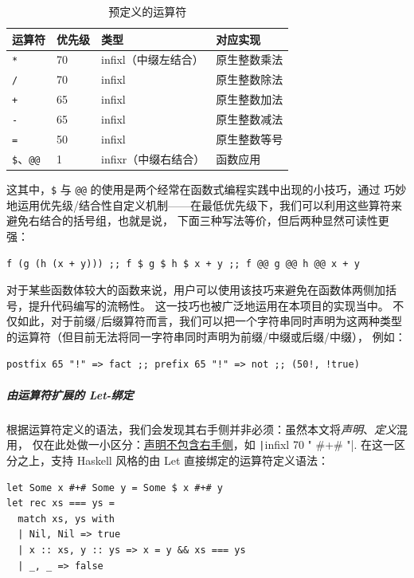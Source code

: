 \begin{table}
  \centering
  \caption{预定义的运算符}\label{tab:exproperator-prec}
  \begin{tabular}{@{}llll@{}}
    \toprule
    \textbf{运算符} & \textbf{优先级} & \textbf{类型}  & \textbf{对应实现}                   \\ \midrule
    \texttt{*}        & 70         & infixl（中缀左结合） & 原生整数乘法 \\
    \texttt{/}        & 70         & infixl & 原生整数除法       \\
    \texttt{+}        & 65         & infixl & 原生整数加法       \\
    \texttt{-}        & 65         & infixl & 原生整数减法    \\
    \texttt{=}        & 50         & infixl & 原生整数等号       \\
    \texttt{\$}、\texttt{@@}       & 1          & infixr（中缀右结合）& 函数应用             \\ \bottomrule
  \end{tabular}
\end{table}

这其中，\texttt{\$} 与 \texttt{@@} 的使用是两个经常在函数式编程实践中出现的小技巧，通过
巧妙地运用优先级/结合性自定义机制——在最低优先级下，我们可以利用这些算符来避免右结合的括号组，也就是说，
下面三种写法等价，但后两种显然可读性更强：
\begin{verbatim}
f (g (h (x + y))) ;; f $ g $ h $ x + y ;; f @@ g @@ h @@ x + y
\end{verbatim}
对于某些函数体较大的函数来说，用户可以使用该技巧来避免在函数体两侧加括号，提升代码编写的流畅性。
这一技巧也被广泛地运用在本项目的实现当中。
不仅如此，对于前缀/后缀算符而言，我们可以把一个字符串同时声明为这两种类型的运算符（但目前无法将同一字符串同时声明为前缀/中缀或后缀/中缀），
例如：
\begin{verbatim}
postfix 65 "!" => fact ;; prefix 65 "!" => not ;; (50!, !true)
\end{verbatim}

\subparagraph{由运算符扩展的 Let-绑定}
根据运算符定义的语法，我们会发现其右手侧并非必须：虽然本文将\emph{声明}、\emph{定义}混用，
仅在此处做一小区分：\underline{声明不包含右手侧}，如 \texttt|infixl 70 " #+# "|.
在这一区分之上，\Tigris 支持 Haskell 风格的由 Let 直接绑定的运算符定义语法：
\begin{verbatim}
let Some x #+# Some y = Some $ x #+# y
let rec xs === ys =
  match xs, ys with
  | Nil, Nil => true
  | x :: xs, y :: ys => x = y && xs === ys
  | _, _ => false
\end{verbatim}
\vspace{-1em}

